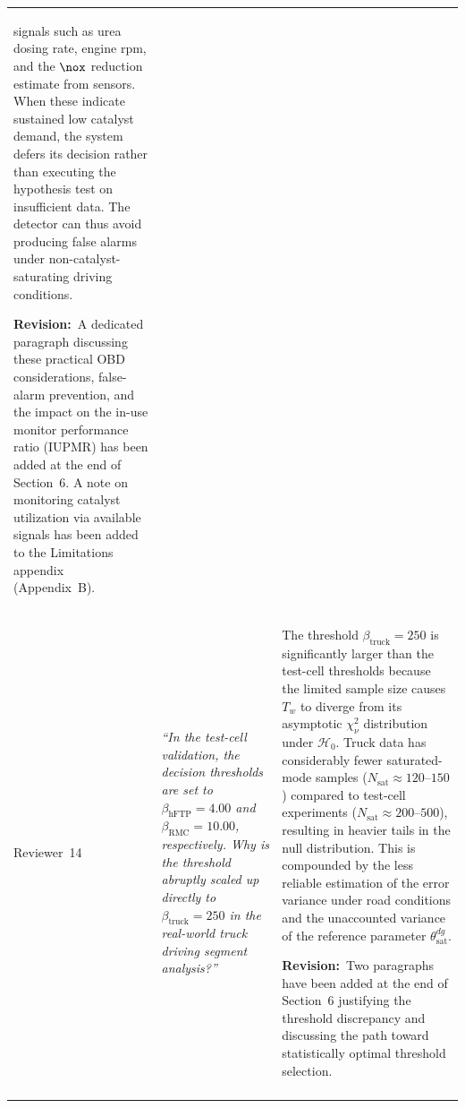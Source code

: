 \documentclass[letterpaper, 10pt]{article}
\newcommand{\rquote}[1]{\textcolor{reviewtext}{\emph{#1}}}
\newcommand{\revision}[1]{\par\smallskip\textcolor{revisioncolor}{\textbf{Revision:}~#1}}
\begin{document}
\begin{longtable}{
    >{\raggedright\arraybackslash\small}p{}
    >{\small}p{}
    >{\small}p{}}
    signals such as urea dosing rate, engine rpm, and the $\nox$ reduction estimate from sensors. When these indicate
    sustained low catalyst demand, the system defers its decision rather than executing the hypothesis test on
    insufficient data. The detector can thus avoid producing false alarms under non-catalyst-saturating driving
    conditions.
    \revision{A dedicated paragraph discussing these practical OBD considerations, false-alarm prevention, and the
        impact on the in-use monitor performance ratio (IUPMR) has been added at the end of Section~6. A note on monitoring
    catalyst utilization via available signals has been added to the Limitations appendix (Appendix~B).} \\
    \arrayrulecolor{rowsep}\midrule\arrayrulecolor{black}
    Reviewer~14
                               &
    \rquote{``In the test-cell validation, the decision thresholds are set to $\beta_{\text{hFTP}} = 4.00$ and
        $\beta_{\text{RMC}} = 10.00$, respectively. Why is the threshold abruptly scaled up directly to
        $\beta_{\text{truck}} = 250$ in the real-world truck driving segment analysis?''}
                               &
    The threshold $\beta_{\text{truck}} = 250$ is significantly larger than the test-cell thresholds because the limited
    sample size causes $T_w$ to diverge from its asymptotic $\chi^2_\nu$ distribution under $\mathcal{H}_0$. Truck data
    has considerably fewer saturated-mode samples ($N_{\text{sat}} \approx 120$--$150$) compared to test-cell
    experiments ($N_{\text{sat}} \approx 200$--$500$), resulting in heavier tails in the null distribution. This is
    compounded by the less reliable estimation of the error variance under road conditions and the unaccounted variance
    of the reference parameter $\theta_{\text{sat}}^{dg}$.
    \revision{Two paragraphs have been added at the end of
        Section~6 justifying the threshold discrepancy and discussing the path toward statistically optimal threshold
    selection.}                                                                                          \\ \arrayrulecolor{rowsep}\midrule\arrayrulecolor{black}

\end{longtable}
\end{document}
